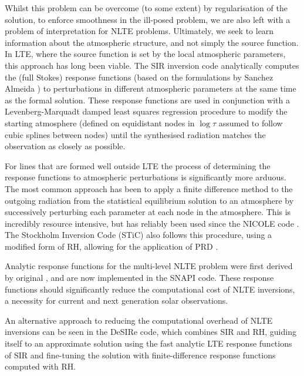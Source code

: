 Whilst this problem can be overcome (to some extent) by regularisation of the solution, to enforce smoothness in the ill-posed problem, we are also left with a problem of interpretation for NLTE problems.
Ultimately, we seek to learn information about the atmospheric structure, and not simply the source function.
In LTE, where the source function is set by the local atmospheric parameters, this approach has long been viable.
The SIR inversion code \citep{1992RuizCobo} analytically computes the (full Stokes) response functions (based on the formulations by Sanchez Almeida \NeedRef{}) to perturbations in different atmospheric parameters at the same time as the formal solution.
These response functions are used in conjunction with a Levenberg-Marquadt damped least squares regression procedure to modify the starting atmosphere (defined on equidistant nodes in $\log \tau$ assumed to follow cubic splines between nodes) until the synthesised radiation matches the observation as closely as possible.

For lines that are formed well outside LTE the process of determining the response functions to atmospheric perturbations is significantly more arduous.
The most common approach has been to apply a finite difference method to the outgoing radiation from the statistical equilibrium solution to an atmosphere by successively perturbing each parameter at each node in the atmosphere.
This is incredibly resource intensive, but has reliably been used since the NICOLE code \citep[first distributed 2000]{Socas-Navarro2015}.
The Stockholm Inversion Code (STiC) also follows this procedure, using a modified form of RH, allowing for the application of PRD \citep{2019dlcr}.

Analytic response functions for the multi-level NLTE problem were first derived by \NeedRef{} original \citet{Milic2018}, and are now implemented in the SNAPI code.
These response functions should significantly reduce the computational cost of NLTE inversions, a necessity for current and next generation solar observations.

An alternative approach to reducing the computational overhead of NLTE inversions can be seen in the DeSIRe code, which combines SIR and RH, guiding itself to an approximate solution using the fast analytic LTE response functions of SIR and fine-tuning the solution with finite-difference response functions computed with RH. \NeedRef{}

